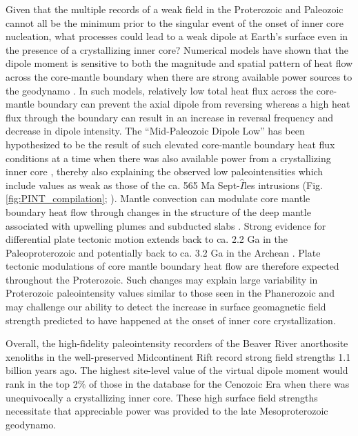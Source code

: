 Given that the multiple records of a weak field in the Proterozoic and Paleozoic cannot all be the minimum prior to the singular event of the onset of inner core nucleation, what processes could lead to a weak dipole at Earth's surface even in the presence of a crystallizing inner core? Numerical models have shown that the dipole moment is sensitive to both the magnitude and spatial pattern of heat flow across the core-mantle boundary when there are strong available power sources to the geodynamo \citep{Olson2007a, Olson2010a}. In such models, relatively low total heat flux across the core-mantle boundary can prevent the axial dipole from reversing whereas a high heat flux through the boundary can result in an increase in reversal frequency and decrease in dipole intensity. The ``Mid-Paleozoic Dipole Low'' has been hypothesized to be the result of such elevated core-mantle boundary heat flux conditions at a time when there was also available power from a crystallizing inner core \citep{Hawkins2019a}, thereby also explaining the observed low paleointensities which include values as weak as those of the ca. 565 Ma Sept-$\hat{I}$les intrusions (Fig. \ref{fig:PINT_compilation}; \citealp{Bono2019a}). Mantle convection can modulate core mantle boundary heat flow through changes in the structure of the deep mantle associated with upwelling plumes \citep{Larson1991a, Courtillot2007a} and subducted slabs \citep{Tan2002b, Biggin2012a, Hounslow2018a}. Strong evidence for differential plate tectonic motion extends back to ca. 2.2 Ga in the Paleoproterozoic \citep{Mitchell2014a, Swanson-Hysell2021b} and potentially back to ca. 3.2 Ga in the Archean \citep{Brenner2020a}. Plate tectonic modulations of core mantle boundary heat flow are therefore expected throughout the Proterozoic. Such changes may explain large variability in Proterozoic paleointensity values similar to those seen in the Phanerozoic \citep{Lloyd2021a} and may challenge our ability to detect the increase in surface geomagnetic field strength predicted to have happened at the onset of inner core crystallization. 

Overall, the high-fidelity paleointensity recorders of the Beaver River anorthosite xenoliths in the well-preserved Midcontinent Rift record strong field strengths 1.1 billion years ago. The highest site-level value of the virtual dipole moment would rank in the top 2$\%$ of those in the database for the Cenozoic Era when there was unequivocally a crystallizing inner core. These high surface field strengths necessitate that appreciable power was provided to the late Mesoproterozoic geodynamo. 

